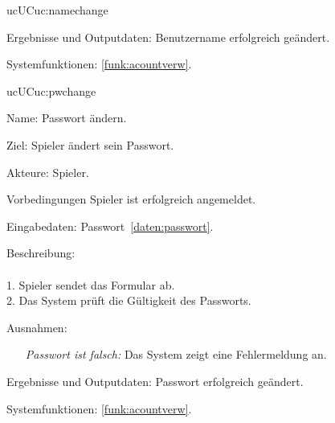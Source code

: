 \begin{description}[leftmargin=5em, style=sameline]
\begin{lhp}{uc}{UC}{uc:namechange}
\begin{itemize}
		    \end{itemize}
		\item [Ergebnisse und Outputdaten:] Benutzername erfolgreich geändert.	
		\item [Systemfunktionen:] \ref{funk:acountverw}.
	\end{lhp}	
	
	\begin{lhp}{uc}{UC}{uc:pwchange}
		\item [Name:] Passwort ändern.
		\item [Ziel:] Spieler ändert sein Passwort.
		\item [Akteure:] Spieler.
		\item [Vorbedingungen] Spieler ist erfolgreich angemeldet.
		\item [Eingabedaten:] Passwort~\ref{daten:passwort}.
		\item [Beschreibung:] \hfill\\ \hfill\\
			1. Spieler sendet das Formular ab.\\
			2. Das System prüft die Gültigkeit des Passworts.\\				
		\item [Ausnahmen:]\hfill 
	    	\begin{itemize} 
			    \item[] \textit{Passwort ist falsch:} Das System zeigt eine Fehlermeldung an.					
			
		    \end{itemize}
		\item [Ergebnisse und Outputdaten:] Passwort erfolgreich geändert.	
		\item [Systemfunktionen:] \ref{funk:acountverw}.
	\end{lhp}	
	

\end{description}
